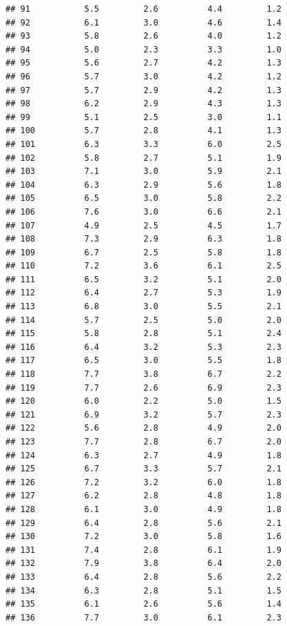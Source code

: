 \documentclass[]{book}
\theoremstyle{definition}
\theoremstyle{definition}
\theoremstyle{definition}
\theoremstyle{remark}
\begin{document}
\begin{verbatim}
## 91           5.5         2.6          4.4         1.2
## 92           6.1         3.0          4.6         1.4
## 93           5.8         2.6          4.0         1.2
## 94           5.0         2.3          3.3         1.0
## 95           5.6         2.7          4.2         1.3
## 96           5.7         3.0          4.2         1.2
## 97           5.7         2.9          4.2         1.3
## 98           6.2         2.9          4.3         1.3
## 99           5.1         2.5          3.0         1.1
## 100          5.7         2.8          4.1         1.3
## 101          6.3         3.3          6.0         2.5
## 102          5.8         2.7          5.1         1.9
## 103          7.1         3.0          5.9         2.1
## 104          6.3         2.9          5.6         1.8
## 105          6.5         3.0          5.8         2.2
## 106          7.6         3.0          6.6         2.1
## 107          4.9         2.5          4.5         1.7
## 108          7.3         2.9          6.3         1.8
## 109          6.7         2.5          5.8         1.8
## 110          7.2         3.6          6.1         2.5
## 111          6.5         3.2          5.1         2.0
## 112          6.4         2.7          5.3         1.9
## 113          6.8         3.0          5.5         2.1
## 114          5.7         2.5          5.0         2.0
## 115          5.8         2.8          5.1         2.4
## 116          6.4         3.2          5.3         2.3
## 117          6.5         3.0          5.5         1.8
## 118          7.7         3.8          6.7         2.2
## 119          7.7         2.6          6.9         2.3
## 120          6.0         2.2          5.0         1.5
## 121          6.9         3.2          5.7         2.3
## 122          5.6         2.8          4.9         2.0
## 123          7.7         2.8          6.7         2.0
## 124          6.3         2.7          4.9         1.8
## 125          6.7         3.3          5.7         2.1
## 126          7.2         3.2          6.0         1.8
## 127          6.2         2.8          4.8         1.8
## 128          6.1         3.0          4.9         1.8
## 129          6.4         2.8          5.6         2.1
## 130          7.2         3.0          5.8         1.6
## 131          7.4         2.8          6.1         1.9
## 132          7.9         3.8          6.4         2.0
## 133          6.4         2.8          5.6         2.2
## 134          6.3         2.8          5.1         1.5
## 135          6.1         2.6          5.6         1.4
## 136          7.7         3.0          6.1         2.3

\end{verbatim}
\end{document}
